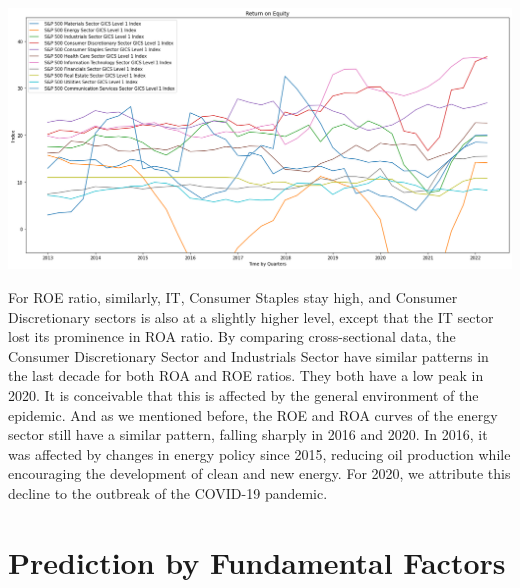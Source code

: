 \documentclass{article}
\begin{document}
\begin{center}
    \includegraphics[scale=0.40]{roe.png}
\end{center}
For ROE ratio, similarly, IT, Consumer Staples stay high, and Consumer Discretionary sectors is also at a slightly higher level, except that the IT sector lost its prominence in ROA ratio. 
By comparing cross-sectional data, the Consumer Discretionary Sector and Industrials Sector have similar patterns in the last decade for both ROA and ROE ratios. They both have a low peak in 2020. It is conceivable that this is affected by the general environment of the epidemic.
And as we mentioned before, the ROE and ROA curves of the energy sector still have a similar pattern, falling sharply in 2016 and 2020. In 2016, it was affected by changes in energy policy since 2015, reducing oil production while encouraging the development of clean and new energy. For 2020, we attribute this decline to the outbreak of the COVID-19 pandemic.
\section{Prediction by Fundamental Factors}
\end{document}
